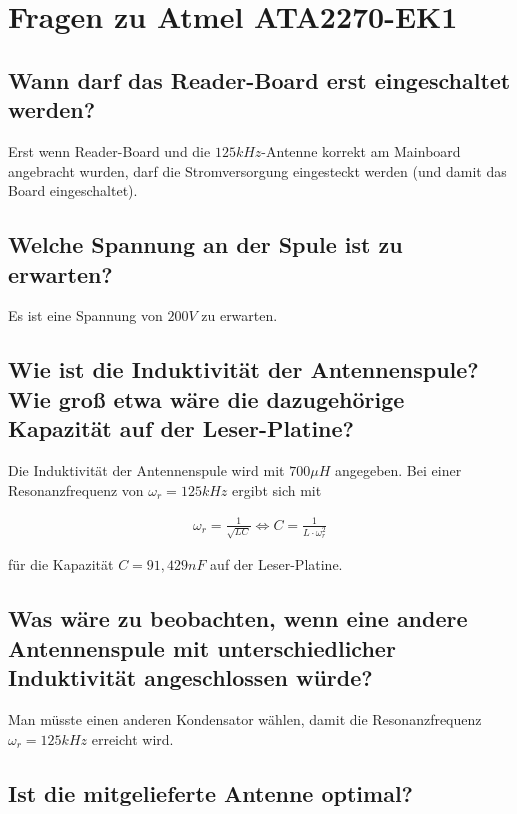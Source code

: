 \documentclass[paper=a4,fontsize=11pt,headsepline,footsepline,parskip=half]{scrartcl}
\begin{document}
\section{Fragen zu Atmel ATA2270-EK1}

\subsection{Wann darf das Reader-Board erst eingeschaltet werden?}

Erst wenn Reader-Board und die $125 kHz$-Antenne korrekt am Mainboard angebracht wurden, darf die Stromversorgung eingesteckt werden (und damit das Board eingeschaltet).

\subsection{Welche Spannung an der Spule ist zu erwarten?}

Es ist eine Spannung von $200 V$ zu erwarten.

\subsection{Wie ist die Induktivität der Antennenspule? Wie groß etwa wäre die dazugehörige Kapazität auf der Leser-Platine?}

Die Induktivität der Antennenspule wird mit $700 \mu H$ angegeben. Bei einer Resonanzfrequenz von $\omega_r = 125 kHz$ ergibt sich mit

\begin{align}
 \omega_r = \frac{1}{\sqrt{LC}} \Leftrightarrow C = \frac{1}{L \cdot \omega_r^2}
\end{align}

für die Kapazität $C = 91,429 nF$ auf der Leser-Platine.

\subsection{Was wäre zu beobachten, wenn eine andere Antennenspule mit unterschiedlicher Induktivität angeschlossen würde?}

Man müsste einen anderen Kondensator wählen, damit die Resonanzfrequenz $\omega_r = 125 kHz$ erreicht wird.

\subsection{Ist die mitgelieferte Antenne optimal?}
\end{document}
